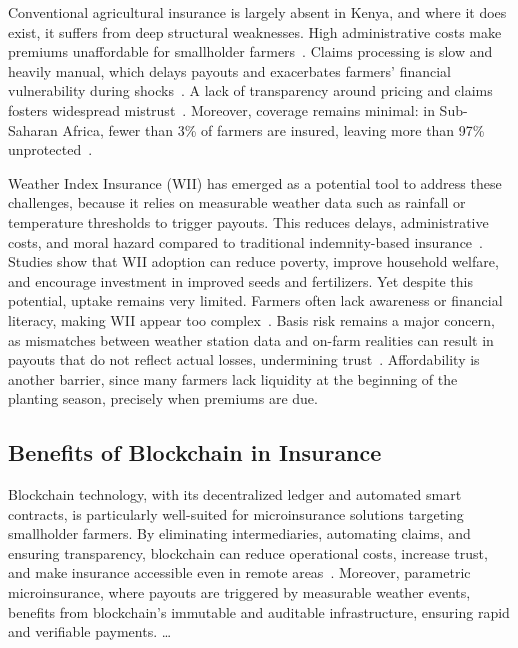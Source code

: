 \documentclass[11pt,a4paper]{article}
\begin{document}
	Conventional agricultural insurance is largely absent in Kenya, and where it does exist, it suffers from deep structural weaknesses.
	High administrative costs make premiums unaffordable for smallholder farmers~\parencite{Dominguez2024}.
	Claims processing is slow and heavily manual, which delays payouts and exacerbates farmers’ financial vulnerability during shocks~\parencite{Chainlink2021}.
	A lack of transparency around pricing and claims fosters widespread mistrust~\parencite{Dominguez2024}.
	Moreover, coverage remains minimal: in Sub-Saharan Africa, fewer than 3\% of farmers are insured, leaving more than 97\% unprotected~\parencite{WorldBank2022}.

	Weather Index Insurance (WII) has emerged as a potential tool to address these challenges, because it relies on measurable weather data such as rainfall or temperature thresholds to trigger payouts.
	This reduces delays, administrative costs, and moral hazard compared to traditional indemnity-based insurance~\parencite{Baagoe2020,Sibiko2018}.
	Studies show that WII adoption can reduce poverty, improve household welfare, and encourage investment in improved seeds and fertilizers.
	Yet despite this potential, uptake remains very limited.
	Farmers often lack awareness or financial literacy, making WII appear too complex~\parencite{Janzen2020}.
	Basis risk remains a major concern, as mismatches between weather station data and on-farm realities can result in payouts that do not reflect actual losses, undermining trust~\parencite{Jensen2016}.
	Affordability is another barrier, since many farmers lack liquidity at the beginning of the planting season, precisely when premiums are due.

	\subsection{Benefits of Blockchain in Insurance}\label{subsec:blockchain-benefits}
	Blockchain technology, with its decentralized ledger and automated smart contracts, is particularly well-suited for microinsurance solutions targeting smallholder farmers.
	By eliminating intermediaries, automating claims, and ensuring transparency, blockchain can reduce operational costs, increase trust, and make insurance accessible even in remote areas~\parencite{Dominguez2024,Shetty2022}.
	Moreover, parametric microinsurance, where payouts are triggered by measurable weather events, benefits from blockchain’s immutable and auditable infrastructure, ensuring rapid and verifiable payments. \ldots
\end{document}
